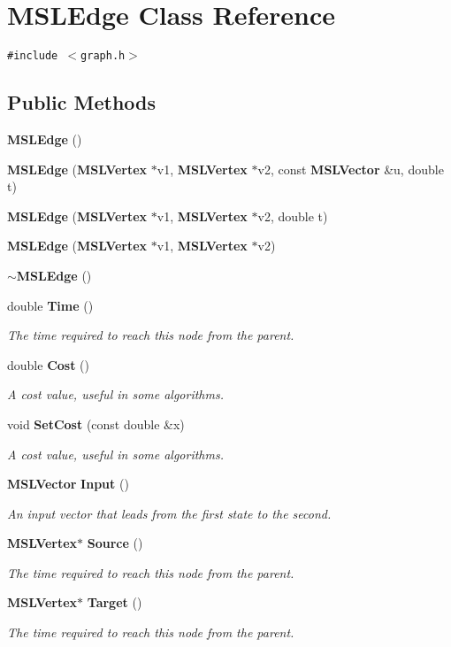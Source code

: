 \section{MSLEdge  Class Reference}
\label{class_MSLEdge}
{\tt \#include $<$graph.h$>$}

\subsection*{Public Methods}
\begin{CompactItemize}
\item 
{\bf MSLEdge} ()
\item 
{\bf MSLEdge} ({\bf MSLVertex} $\ast$v1, {\bf MSLVertex} $\ast$v2, const {\bf MSLVector} \&u, double t)
\item 
{\bf MSLEdge} ({\bf MSLVertex} $\ast$v1, {\bf MSLVertex} $\ast$v2, double t)
\item 
{\bf MSLEdge} ({\bf MSLVertex} $\ast$v1, {\bf MSLVertex} $\ast$v2)
\item 
{\bf $\sim$MSLEdge} ()
\item 
double {\bf Time} ()
\begin{CompactList}\small\item\em The time required to reach this node from the parent.\item\end{CompactList}\item 
double {\bf Cost} ()
\begin{CompactList}\small\item\em A cost value, useful in some algorithms.\item\end{CompactList}\item 
void {\bf Set\-Cost} (const double \&x)
\begin{CompactList}\small\item\em A cost value, useful in some algorithms.\item\end{CompactList}\item 
{\bf MSLVector} {\bf Input} ()
\begin{CompactList}\small\item\em An input vector that leads from the first state to the second.\item\end{CompactList}\item 
{\bf MSLVertex}$\ast$ {\bf Source} ()
\begin{CompactList}\small\item\em The time required to reach this node from the parent.\item\end{CompactList}\item 
{\bf MSLVertex}$\ast$ {\bf Target} ()
\begin{CompactList}\small\item\em The time required to reach this node from the parent.\item\end{CompactList}\end{CompactItemize}
